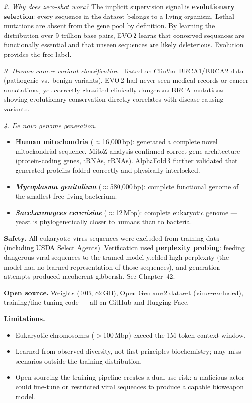\begin{paperbox}[title={EVO\,2: Genome Modelling and Design Across All Domains of Life
  (Brixi et al.\ 2025, Arc Institute / Together AI / Stanford, \textit{Nature})}]
\textit{2. Why does zero-shot work?} The implicit supervision signal is
\textbf{evolutionary selection}: every sequence in the dataset belongs to a living
organism. Lethal mutations are absent from the gene pool by definition. By learning the
distribution over 9 trillion base pairs, EVO\,2 learns that conserved sequences are
functionally essential and that unseen sequences are likely deleterious. Evolution
provides the free label.

\textit{3. Human cancer variant classification.} Tested on ClinVar BRCA1/BRCA2 data
(pathogenic vs.\ benign variants). EVO\,2 had never seen medical records or cancer
annotations, yet correctly classified clinically dangerous BRCA mutations --- showing
evolutionary conservation directly correlates with disease-causing variants.

\textit{4. De novo genome generation.}
\begin{itemize}
  \item \textbf{Human mitochondria} ($\approx$16,000\,bp): generated a complete novel
    mitochondrial sequence. MitoZ analysis confirmed correct gene architecture
    (protein-coding genes, tRNAs, rRNAs). AlphaFold\,3 further validated that
    generated proteins folded correctly and physically interlocked.
  \item \textbf{\textit{Mycoplasma genitalium}} ($\approx$580,000\,bp): complete
    functional genome of the smallest free-living bacterium.
  \item \textbf{\textit{Saccharomyces cerevisiae}} ($\approx$12\,Mbp): complete
    eukaryotic genome --- yeast is phylogenetically closer to humans than to bacteria.
\end{itemize}

\medskip
\textbf{Safety.} All eukaryotic virus sequences were excluded from training data
(including USDA Select Agents). Verification used \textbf{perplexity probing}: feeding
dangerous viral sequences to the trained model yielded high perplexity (the model
had no learned representation of those sequences), and generation attempts produced
incoherent gibberish. See Chapter~42.

\medskip
\textbf{Open source.} Weights (40B, 82\,GB), Open Genome\,2 dataset (virus-excluded),
training/fine-tuning code --- all on GitHub and Hugging Face.

\medskip
\textbf{Limitations.}
\begin{itemize}
  \item Eukaryotic chromosomes ($>$100\,Mbp) exceed the 1M-token context window.
  \item Learned from observed diversity, not first-principles biochemistry; may miss
    scenarios outside the training distribution.
  \item Open-sourcing the training pipeline creates a dual-use risk: a malicious actor
    could fine-tune on restricted viral sequences to produce a capable bioweapon model.
\end{itemize}


\end{paperbox}
